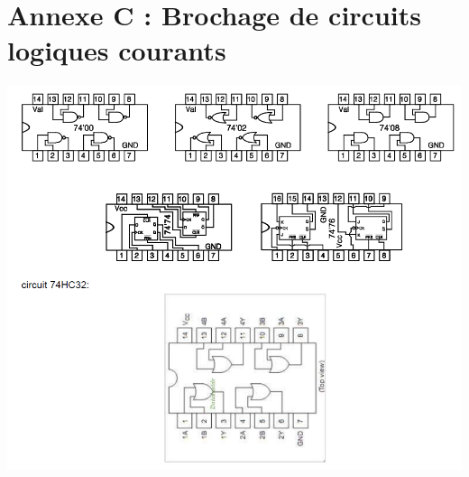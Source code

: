 \section*{Annexe C : Brochage de circuits logiques courants}
\vspace{-0.1cm}
\label{ANNEXE C}
\begin{center}
\includegraphics[scale=0.8]{Labo3_AnnexeC.png}
\end{center}

\endinput